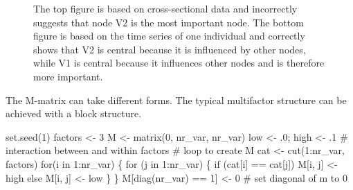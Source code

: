 \documentclass[
  a4paper,
  DIV=11,
  numbers=noendperiod,
  oneside]{scrreprt}
\newenvironment{Shaded}{}{}
\newcommand{\CommentTok}[1]{\textcolor[rgb]{0.42,0.45,0.49}{#1}}
\newcommand{\ControlFlowTok}[1]{\textcolor[rgb]{0.84,0.23,0.29}{#1}}
\newcommand{\DecValTok}[1]{\textcolor[rgb]{0.00,0.36,0.77}{#1}}
\newcommand{\FunctionTok}[1]{\textcolor[rgb]{0.44,0.26,0.76}{#1}}
\newcommand{\NormalTok}[1]{\textcolor[rgb]{0.14,0.16,0.18}{#1}}
\newcommand{\OtherTok}[1]{\textcolor[rgb]{0.44,0.26,0.76}{#1}}
\newcommand{\SpecialCharTok}[1]{\textcolor[rgb]{0.00,0.36,0.77}{#1}}
\begin{document}
\begin{figure}


\caption{\label{fig-ch6-img16-old-85}The top figure is based on
cross-sectional data and incorrectly suggests that node V2 is the most
important node. The bottom figure is based on the time series of one
individual and correctly shows that V2 is central because it is
influenced by other nodes, while V1 is central because it influences
other nodes and is therefore more important.}

\end{figure}%

The M-matrix can take different forms. The typical multifactor structure
can be achieved with a block structure.

\begin{Shaded}
\begin{Highlighting}[]
\FunctionTok{set.seed}\NormalTok{(}\DecValTok{1}\NormalTok{)}
\NormalTok{factors }\OtherTok{\textless{}{-}} \DecValTok{3}
\NormalTok{M }\OtherTok{\textless{}{-}} \FunctionTok{matrix}\NormalTok{(}\DecValTok{0}\NormalTok{, nr\_var, nr\_var)}
\NormalTok{low }\OtherTok{\textless{}{-}}\NormalTok{ .}\DecValTok{0}\NormalTok{; high }\OtherTok{\textless{}{-}}\NormalTok{ .}\DecValTok{1} \CommentTok{\# interaction between and within factors}
\CommentTok{\# loop to create M}
\NormalTok{cat }\OtherTok{\textless{}{-}} \FunctionTok{cut}\NormalTok{(}\DecValTok{1}\SpecialCharTok{:}\NormalTok{nr\_var, factors)}
\ControlFlowTok{for}\NormalTok{(i }\ControlFlowTok{in} \DecValTok{1}\SpecialCharTok{:}\NormalTok{nr\_var) \{}
  \ControlFlowTok{for}\NormalTok{ (j }\ControlFlowTok{in} \DecValTok{1}\SpecialCharTok{:}\NormalTok{nr\_var) \{}
    \ControlFlowTok{if}\NormalTok{ (cat[i] }\SpecialCharTok{==}\NormalTok{ cat[j])}
\NormalTok{      M[i, j] }\OtherTok{\textless{}{-}}\NormalTok{ high }\ControlFlowTok{else}\NormalTok{ M[i, j] }\OtherTok{\textless{}{-}}\NormalTok{ low}
\NormalTok{  \}}
\NormalTok{\}}
\NormalTok{M[}\FunctionTok{diag}\NormalTok{(nr\_var) }\SpecialCharTok{==} \DecValTok{1}\NormalTok{] }\OtherTok{\textless{}{-}} \DecValTok{0} \CommentTok{\# set diagonal of m to 0}
\end{Highlighting}
\end{Shaded}
\end{document}
